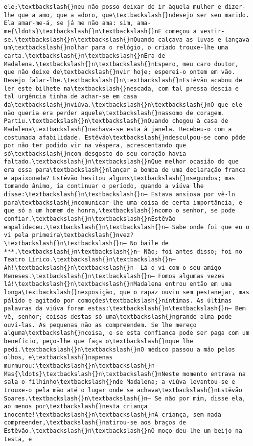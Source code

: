 \begin{Verbatim}[commandchars=\\\{\}]
ele;\textbackslash{}neu não posso deixar de ir àquela mulher e dizer-lhe que a amo, que a adoro, que\textbackslash{}ndesejo ser seu marido. Ela amar-me-á, se já me não ama: sim, ama-me{\ldots}\textbackslash{}n\textbackslash{}nE começou a vestir-se.\textbackslash{}n\textbackslash{}nQuando calçava as luvas e lançava um\textbackslash{}nolhar para o relógio, o criado trouxe-lhe uma carta.\textbackslash{}n\textbackslash{}nEra de Madalena.\textbackslash{}n\textbackslash{}nEspero, meu caro doutor, que não deixe de\textbackslash{}nvir hoje; esperei-o ontem em vão. Desejo falar-lhe.\textbackslash{}n\textbackslash{}nEstêvão acabou de ler este bilhete na\textbackslash{}nescada, com tal pressa descia e tal urgência tinha de achar-se em casa da\textbackslash{}nviúva.\textbackslash{}n\textbackslash{}nO que ele não queria era perder aquele\textbackslash{}nassomo de coragem. Partiu.\textbackslash{}n\textbackslash{}nQuando chegou à casa de Madalena\textbackslash{}nachava-se esta à janela. Recebeu-o com a costumada afabilidade. Estêvão\textbackslash{}ndesculpou-se como pôde por não ter podido vir na véspera, acrescentando que só\textbackslash{}ncom desgosto do seu coração havia faltado.\textbackslash{}n\textbackslash{}nQue melhor ocasião do que era essa para\textbackslash{}nlançar a bomba de uma declaração franca e apaixonada? Estêvão hesitou alguns\textbackslash{}nsegundos; mas tomando ânimo, ia continuar o período, quando a viúva lhe disse:\textbackslash{}n\textbackslash{}n— Estava ansiosa por vê-lo para\textbackslash{}ncomunicar-lhe uma coisa de certa importância, e que só a um homem de honra,\textbackslash{}ncomo o senhor, se pode confiar.\textbackslash{}n\textbackslash{}nEstêvão empalideceu.\textbackslash{}n\textbackslash{}n— Sabe onde foi que eu o vi pela primeira\textbackslash{}nvez?\textbackslash{}n\textbackslash{}n— No baile de ***.\textbackslash{}n\textbackslash{}n— Não; foi antes disso; foi no Teatro Lírico.\textbackslash{}n\textbackslash{}n— Ah!\textbackslash{}n\textbackslash{}n— Lá o vi com o seu amigo Meneses.\textbackslash{}n\textbackslash{}n— Fomos algumas vezes lá!\textbackslash{}n\textbackslash{}nMadalena entrou então em uma longa\textbackslash{}nexposição, que o rapaz ouviu sem pestanejar, mas pálido e agitado por comoções\textbackslash{}níntimas. As últimas palavras da viúva foram estas:\textbackslash{}n\textbackslash{}n— Bem vê, senhor; coisas destas só uma\textbackslash{}ngrande alma pode ouvi-las. As pequenas não as compreendem. Se lhe mereço alguma\textbackslash{}ncoisa, e se esta confiança pode ser paga com um benefício, peço-lhe que faça o\textbackslash{}nque lhe pedi.\textbackslash{}n\textbackslash{}nO médico passou a mão pelos olhos, e\textbackslash{}napenas murmurou:\textbackslash{}n\textbackslash{}n— Mas{\ldots}\textbackslash{}n\textbackslash{}nNeste momento entrava na sala o filhinho\textbackslash{}nde Madalena; a viúva levantou-se e trouxe-o pela mão até o lugar onde se achava\textbackslash{}nEstêvão Soares.\textbackslash{}n\textbackslash{}n— Se não por mim, disse ela, ao menos por\textbackslash{}nesta criança inocente!\textbackslash{}n\textbackslash{}nA criança, sem nada compreender,\textbackslash{}natirou-se aos braços de Estêvão.\textbackslash{}n\textbackslash{}nO moço deu-lhe um beijo na testa, e 
\end{Verbatim}
